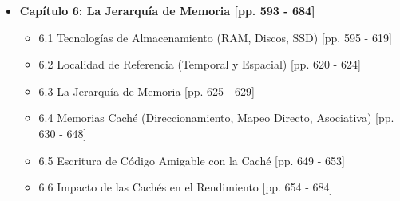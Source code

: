 \documentclass[11pt,a4paper]{article}
\begin{document}
\begin{itemize}
\begin{itemize}
\begin{itemize}
            \item 5.10 Resumen de Técnicas y Profiling en el Mundo Real [pp. 558 - 592]
        \end{itemize}
        \item \textbf{Capítulo 6: La Jerarquía de Memoria [pp. 593 - 684]}
        \begin{itemize}
            \item 6.1 Tecnologías de Almacenamiento (RAM, Discos, SSD) [pp. 595 - 619]
            \item 6.2 Localidad de Referencia (Temporal y Espacial) [pp. 620 - 624]
            \item 6.3 La Jerarquía de Memoria [pp. 625 - 629]
            \item 6.4 Memorias Caché (Direccionamiento, Mapeo Directo, Asociativa) [pp. 630 - 648]
            \item 6.5 Escritura de Código Amigable con la Caché [pp. 649 - 653]
            \item 6.6 Impacto de las Cachés en el Rendimiento [pp. 654 - 684]
        \end{itemize}
    \end{itemize}


\end{itemize}
\end{document}
